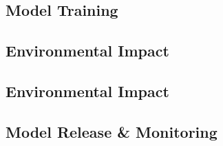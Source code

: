 



\tocless\subsection{Model Training}






\tocless\subsection{Environmental Impact}




\tocless\subsection{Environmental Impact}






\tocless\subsection{Model Release \& Monitoring}




